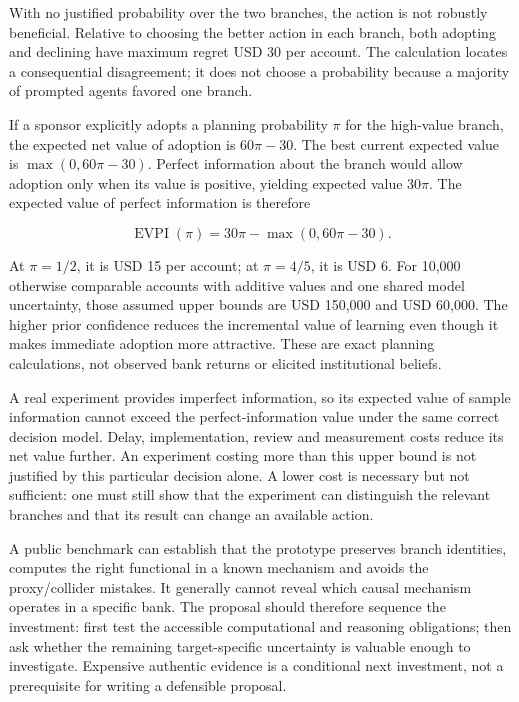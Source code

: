 With no justified probability over the two branches, the action is not
robustly beneficial. Relative to choosing the better action in each
branch, both adopting and declining have maximum regret USD 30 per
account. The calculation locates a consequential disagreement; it does
not choose a probability because a majority of prompted agents favored
one branch. \citep{exec13_diagram_examples}

If a sponsor explicitly adopts a planning probability \(\pi\) for the
high-value branch, the expected net value of adoption is \(60\pi-30\).
The best current expected value is \(\max(0,60\pi-30)\). Perfect
information about the branch would allow adoption only when its value is
positive, yielding expected value \(30\pi\). The expected value of
perfect information is therefore

\[
 \operatorname{EVPI}(\pi)
 =30\pi-\max(0,60\pi-30).
\]

At \(\pi=1/2\), it is USD 15 per account; at \(\pi=4/5\), it is USD 6.
For 10,000 otherwise comparable accounts with additive values and one
shared model uncertainty, those assumed upper bounds are USD 150,000 and
USD 60,000. The higher prior confidence reduces the incremental value of
learning even though it makes immediate adoption more attractive. These
are exact planning calculations, not observed bank returns or elicited
institutional beliefs. \citep{exec13_diagram_examples}

A real experiment provides imperfect information, so its expected value
of sample information cannot exceed the perfect-information value under
the same correct decision model. Delay, implementation, review and
measurement costs reduce its net value further. An experiment costing
more than this upper bound is not justified by this particular decision
alone. A lower cost is necessary but not sufficient: one must still show
that the experiment can distinguish the relevant branches and that its
result can change an available action.

A public benchmark can establish that the prototype preserves branch
identities, computes the right functional in a known mechanism and
avoids the proxy/collider mistakes. It generally cannot reveal which
causal mechanism operates in a specific bank. The proposal should
therefore sequence the investment: first test the accessible
computational and reasoning obligations; then ask whether the remaining
target-specific uncertainty is valuable enough to investigate. Expensive
authentic evidence is a conditional next investment, not a prerequisite
for writing a defensible proposal.

